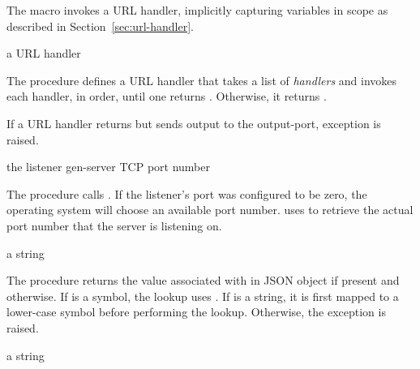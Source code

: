 \begin{syntax}
\end{syntax}

The  macro invokes a URL handler,
implicitly capturing variables in scope as described in
Section~\ref{sec:url-handler}.

\begin{procedure}
\end{procedure}
\returns{} a URL handler

The  procedure defines a URL handler
that takes a list of \emph{handlers} and invokes each handler, in
order, until one returns . Otherwise, it returns .

If a URL handler returns  but sends output to the
output-port, exception  is raised.

\begin{procedure}
\end{procedure}
\returns{} the listener gen-server TCP port number

The  procedure calls . If the listener's port was
configured to be zero, the operating system will choose an available
port number.   uses
 to retrieve the actual port number that
the server is listening on.

\begin{procedure}
\end{procedure}
\returns{} a string \alt{} 

The  procedure returns the value associated
with  in JSON object  if present and 
otherwise.  If  is a symbol, the lookup uses .  If
 is a string, it is first mapped to a lower-case symbol
before performing the lookup.  Otherwise, the exception
 is raised.

\begin{procedure}
\end{procedure}
\returns{} a string

